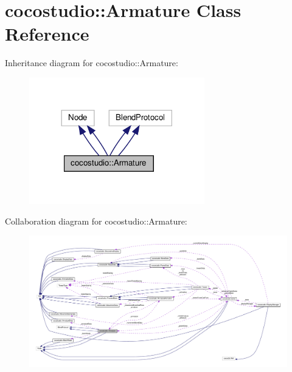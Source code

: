 \hypertarget{classcocostudio_1_1Armature}{}\section{cocostudio\+:\+:Armature Class Reference}
\label{classcocostudio_1_1Armature}


Inheritance diagram for cocostudio\+:\+:Armature\+:
\nopagebreak
\begin{figure}[H]
\begin{center}
\leavevmode
\includegraphics[width=216pt]{classcocostudio_1_1Armature__inherit__graph}
\end{center}
\end{figure}


Collaboration diagram for cocostudio\+:\+:Armature\+:
\nopagebreak
\begin{figure}[H]
\begin{center}
\leavevmode
\includegraphics[width=350pt]{classcocostudio_1_1Armature__coll__graph}
\end{center}
\end{figure}
